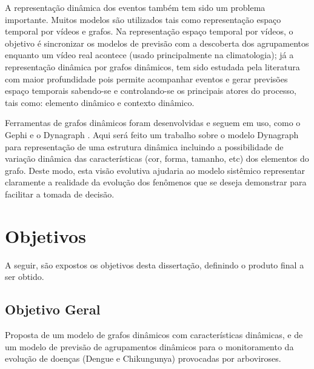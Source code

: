 A representação dinâmica dos eventos também tem sido um problema importante. Muitos modelos são utilizados tais como representação espaço temporal por vídeos e grafos. Na representação espaço temporal por vídeos, o objetivo é sincronizar os modelos de previsão com a descoberta dos agrupamentos enquanto um vídeo real acontece (usado principalmente na climatologia); já a representação dinâmica por grafos dinâmicos, tem sido estudada pela literatura com maior profundidade pois permite acompanhar eventos e gerar previsões espaço temporais sabendo-se e controlando-se os principais atores do processo, tais como: elemento dinâmico e contexto dinâmico.

Ferramentas de grafos dinâmicos foram desenvolvidas e seguem em uso, como o Gephi e o Dynagraph \cite{dynagraph}. Aqui será feito um trabalho sobre o modelo Dynagraph para representação de uma estrutura dinâmica incluindo a possibilidade de variação dinâmica das características (cor, forma, tamanho, etc) dos elementos do grafo. Deste modo, esta visão evolutiva ajudaria ao modelo sistêmico representar claramente a realidade da evolução dos fenômenos que se deseja demonstrar para facilitar a tomada de decisão.





\section{Objetivos}
\label{sec:objetivos}
A seguir, são expostos os objetivos desta dissertação, definindo o produto
final a ser obtido.

\subsection{Objetivo Geral}

Proposta de um modelo de grafos dinâmicos com características dinâmicas, e de um modelo de previsão de agrupamentos dinâmicos para o monitoramento da evolução de doenças (Dengue e Chikungunya) provocadas por arboviroses.


